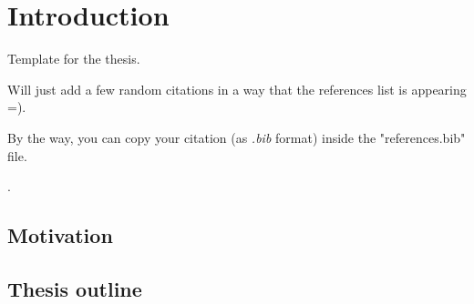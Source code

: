 \chapter{Introduction} 
Template for the thesis. \par
Will just add a few random citations in a way that the references list is appearing =). \par
By the way, you can copy your citation (as \textit{.bib} format) inside the "references.bib" file. \par

\citet{Petley2012Global,Crozier2005Landslide,Guzzetti1999Landslide,Guzzetti2005Landslide,Soeters1996Slope,Cascini2005Landslide,Rossi2013,VanWesten2008Spatial,Cruden1996Landslide}. 


{\textcolor{red}{\lipsum[1-2]}}

\section{Motivation}
{\textcolor{red}{ \lipsum[1-2]}}

\section{Thesis outline}
{\textcolor{red}{ \lipsum[1]}}